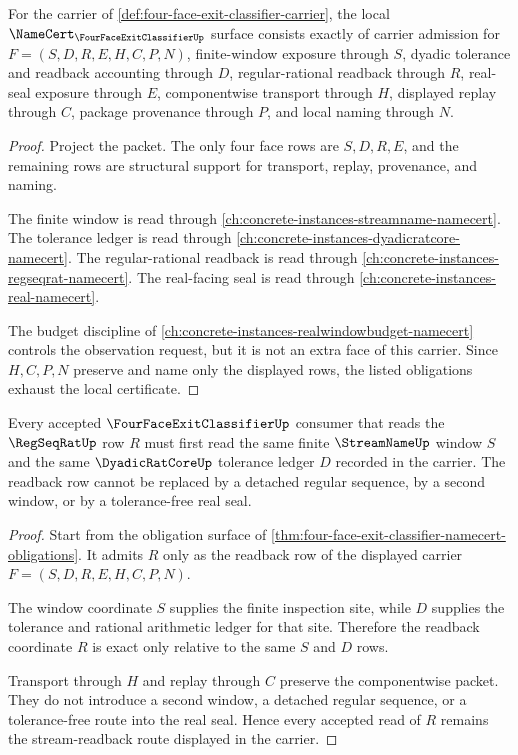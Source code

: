 \begin{theorem}
\label{thm:four-face-exit-classifier-namecert-obligations}
For the carrier of \autoref{def:four-face-exit-classifier-carrier}, the local $\NameCert_{\FourFaceExitClassifierUp}$ surface consists exactly of carrier admission for $F=(S,D,R,E,H,C,P,N)$, finite-window exposure through $S$, dyadic tolerance and readback accounting through $D$, regular-rational readback through $R$, real-seal exposure through $E$, componentwise transport through $H$, displayed replay through $C$, package provenance through $P$, and local naming through $N$.
\end{theorem}
\begin{proof}
Project the packet. The only four face rows are $S,D,R,E$, and the remaining rows are structural support for transport, replay, provenance, and naming.

The finite window is read through \autoref{ch:concrete-instances-streamname-namecert}. The tolerance ledger is read through \autoref{ch:concrete-instances-dyadicratcore-namecert}. The regular-rational readback is read through \autoref{ch:concrete-instances-regseqrat-namecert}. The real-facing seal is read through \autoref{ch:concrete-instances-real-namecert}.

The budget discipline of \autoref{ch:concrete-instances-realwindowbudget-namecert} controls the observation request, but it is not an extra face of this carrier. Since $H,C,P,N$ preserve and name only the displayed rows, the listed obligations exhaust the local certificate.
\end{proof}

\begin{theorem}
\label{thm:four-face-exit-classifier-stream-regseq-exactness}
Every accepted $\FourFaceExitClassifierUp$ consumer that reads the $\RegSeqRatUp$ row $R$ must first read the same finite $\StreamNameUp$ window $S$ and the same $\DyadicRatCoreUp$ tolerance ledger $D$ recorded in the carrier. The readback row cannot be replaced by a detached regular sequence, by a second window, or by a tolerance-free real seal.
\end{theorem}
\begin{proof}
Start from the obligation surface of \autoref{thm:four-face-exit-classifier-namecert-obligations}. It admits $R$ only as the readback row of the displayed carrier $F=(S,D,R,E,H,C,P,N)$.

The window coordinate $S$ supplies the finite inspection site, while $D$ supplies the tolerance and rational arithmetic ledger for that site. Therefore the readback coordinate $R$ is exact only relative to the same $S$ and $D$ rows.

Transport through $H$ and replay through $C$ preserve the componentwise packet. They do not introduce a second window, a detached regular sequence, or a tolerance-free route into the real seal. Hence every accepted read of $R$ remains the stream-readback route displayed in the carrier.
\end{proof}

